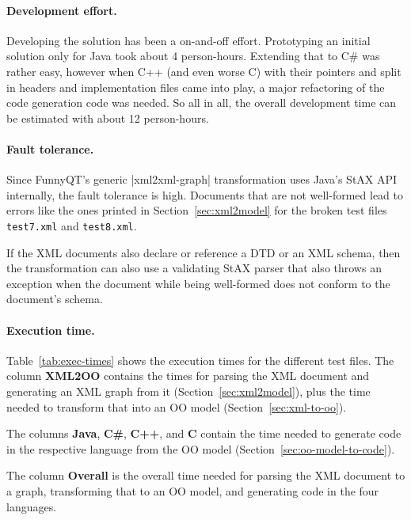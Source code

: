 \documentclass[a4paper]{article}
\newcommand{\code}{\clojureinline}
\begin{document}
\paragraph{Development effort.}
\label{sec:development-effort}

Developing the solution has been a on-and-off effort.  Prototyping an initial
solution only for Java took about 4 person-hours.  Extending that to C\# was
rather easy, however when C++ (and even worse C) with their pointers and split
in headers and implementation files came into play, a major refactoring of the
code generation code was needed.  So all in all, the overall development time
can be estimated with about 12 person-hours.

\paragraph{Fault tolerance.}
\label{sec:fault-tolerance}

Since FunnyQT's generic \code|xml2xml-graph| transformation uses Java's StAX
API internally, the fault tolerance is high.  Documents that are not
well-formed lead to errors like the ones printed in Section~\ref{sec:xml2model}
for the broken test files \texttt{test7.xml} and \texttt{test8.xml}.

If the XML documents also declare or reference a DTD or an XML schema, then the
transformation can also use a validating StAX parser that also throws an
exception when the document while being well-formed does not conform to the
document's schema.


\paragraph{Execution time.}
\label{sec:execution-time}

Table~\ref{tab:exec-times} shows the execution times for the different test
files.  The column \textbf{XML2OO} contains the times for parsing the XML
document and generating an XML graph from it (Section~\ref{sec:xml2model}),
plus the time needed to transform that into an OO model
(Section~\ref{sec:xml-to-oo}).

The columns \textbf{Java}, \textbf{C\#}, \textbf{C++}, and \textbf{C} contain
the time needed to generate code in the respective language from the OO model
(Section~\ref{sec:oo-model-to-code}).

The column \textbf{Overall} is the overall time needed for parsing the XML
document to a graph, transforming that to an OO model, and generating code in
the four languages.
\end{document}
